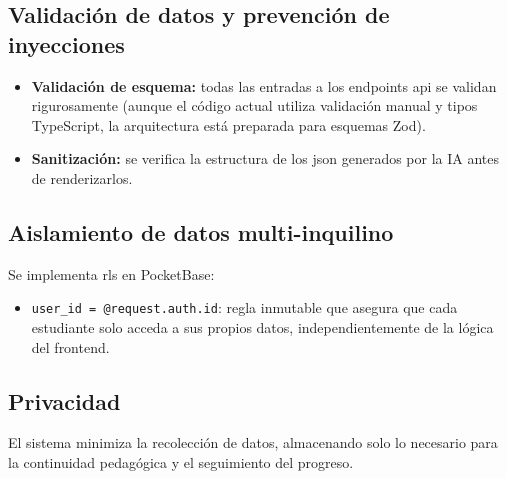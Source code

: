 \subsection{Validación de datos y prevención de inyecciones}
\begin{itemize}
\item \textbf{Validación de esquema:} todas las entradas a los endpoints \gls{api} se validan rigurosamente (aunque el código actual utiliza validación manual y tipos TypeScript, la arquitectura está preparada para esquemas Zod).
\item \textbf{Sanitización:} se verifica la estructura de los \gls{json} generados por la IA antes de renderizarlos.

\end{itemize}
\subsection{Aislamiento de datos multi-inquilino}
Se implementa \gls{rls} en PocketBase:
\begin{itemize}
\item \texttt{user\_id = @request.auth.id}: regla inmutable que asegura que cada estudiante solo acceda a sus propios datos, independientemente de la lógica del frontend.

\end{itemize}
\subsection{Privacidad}
El sistema minimiza la recolección de datos, almacenando solo lo necesario para la continuidad pedagógica y el seguimiento del progreso.